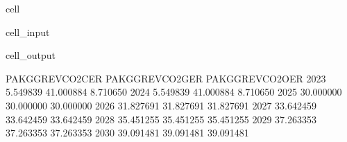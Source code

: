 \documentclass[letterpaper,10pt,english]{jupyterBook}
\begin{document}
\begin{sphinxuseclass}{cell}\begin{sphinxVerbatimInput}

\begin{sphinxuseclass}{cell_input}
\begin{sphinxVerbatim}[commandchars=\\\{\}]
 
    \PYG{p}{[}\PYG{p}{]}
\end{sphinxVerbatim}

\end{sphinxuseclass}\end{sphinxVerbatimInput}
\begin{sphinxVerbatimOutput}

\begin{sphinxuseclass}{cell_output}
\begin{sphinxVerbatim}[commandchars=\\\{\}]
      PAKGGREVCO2CER  PAKGGREVCO2GER  PAKGGREVCO2OER
2023       \PYGZhy{}5.549839      \PYGZhy{}41.000884       \PYGZhy{}8.710650
2024       \PYGZhy{}5.549839      \PYGZhy{}41.000884       \PYGZhy{}8.710650
2025       30.000000       30.000000       30.000000
2026       31.827691       31.827691       31.827691
2027       33.642459       33.642459       33.642459
2028       35.451255       35.451255       35.451255
2029       37.263353       37.263353       37.263353
2030       39.091481       39.091481       39.091481
\end{sphinxVerbatim}

\end{sphinxuseclass}\end{sphinxVerbatimOutput}

\end{sphinxuseclass}
\end{document}
